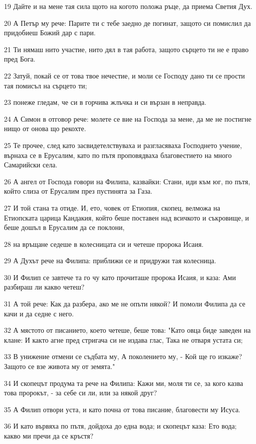 \par 19 Дайте и на мене тая сила щото на когото положа ръце, да приема Светия Дух.
\par 20 А Петър му рече: Парите ти с тебе заедно де погинат, защото си помислил да придобиеш Божий дар с пари.
\par 21 Ти нямаш нито участие, нито дял в тая работа, защото сърцето ти не е право пред Бога.
\par 22 Затуй, покай се от това твое нечестие, и моли се Господу дано ти се прости тая помисъл на сърцето ти;
\par 23 понеже гледам, че си в горчива жлъчка и си вързан в неправда.
\par 24 А Симон в отговор рече: молете се вие на Господа за мене, да ме не постигне нищо от онова що рекохте.
\par 25 Те прочее, след като засвидетелствуваха и разгласяваха Господнето учение, върнаха се в Ерусалим, като по пътя проповядваха благовестието на много Самарийски села.
\par 26 А ангел от Господа говори на Филипа, казвайки: Стани, иди към юг, по пътя, който слиза от Ерусалим през пустинята за Газа.
\par 27 И той стана та отиде. И, ето, човек от Етиопия, скопец, велможа на Етиопската царица Кандакия, който беше поставен над всичкото и съкровище, и беше дошъл в Ерусалим да се поклони,
\par 28 на връщане седеше в колесницата си и четеше пророка Исаия.
\par 29 А Духът рече на Филипа: приближи се и придружи тая колесница.
\par 30 И Филип се завтече та го чу като прочиташе пророка Исаия, и каза: Ами разбираш ли какво четеш?
\par 31 А той рече: Как да разбера, ако ме не опъти някой? И помоли Филипа да се качи и да седне с него.
\par 32 А мястото от писанието, което четеше, беше това: "Като овца биде заведен на клане: И както агне пред стригача си не издава глас, Така не отваря устата си;
\par 33 В унижение отмени се съдбата му, А поколението му, - Кой ще го изкаже? Защото се взе живота му от земята."
\par 34 И скопецът продума та рече на Филипа: Кажи ми, моля ти се, за кого казва това пророкът, - за себе си ли, или за някой друг?
\par 35 А Филип отвори уста, и като почна от това писание, благовести му Исуса.
\par 36 И като вървяха по пътя, дойдоха до една вода; и скопецът каза: Ето вода; какво ми пречи да се кръстя?

